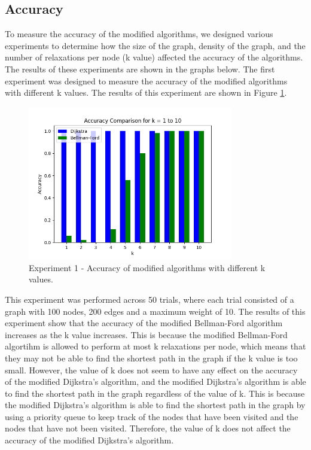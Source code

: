\documentclass{article}
\begin{document}
\begin{onehalfspace}
\subsection*{Accuracy}

To measure the accuracy of the modified algorithms, we designed various experiments to determine how the size of the graph, density of the graph, and the number of relaxations per node (k value) 
affected the accuracy of the algorithms. The results of these experiments are shown in the graphs below. 
\smallskip
\newline
\indent The first experiment was designed to measure the accuracy of the modified algorithms with different k values. 
The results of this experiment are shown in Figure \ref{fig:Figure 1}.


\begin{figure}[H]
    \centering
    \includegraphics[width=0.8\textwidth]{Figures/Accuracy_kvals.png} 
    \caption{\footnotesize Experiment 1 - Accuracy of modified algorithms with different k values.}
    \label{fig:Figure 1} 
\end{figure}

This experiment was performed across 50 trials, where each trial consisted of a graph with 100 nodes, 200 edges and a maximum weight of 10. 
The results of this experiment show that the accuracy of the modified Bellman-Ford algorithm increases as the k value increases. This is because the modified Bellman-Ford algortihm is allowed to perform at most k relaxations per node, which means that they may not be able to find the shortest path in the graph if the k value is too small.
\smallskip
\newline
\indent However, the value of k does not seem to have any effect on the accuracy of the modified Dijkstra's algorithm, and the modified Dijkstra's algorithm is able to find the shortest path in the graph regardless of the value of k. This is because the modified Dijkstra's algorithm is able to find the shortest path in the graph by using a priority queue to keep track of the nodes that have been visited and the nodes that have not been visited.
Therefore, the value of k does not affect the accuracy of the modified Dijkstra's algorithm.
\smallskip
\newline


\end{onehalfspace}
\end{document}
